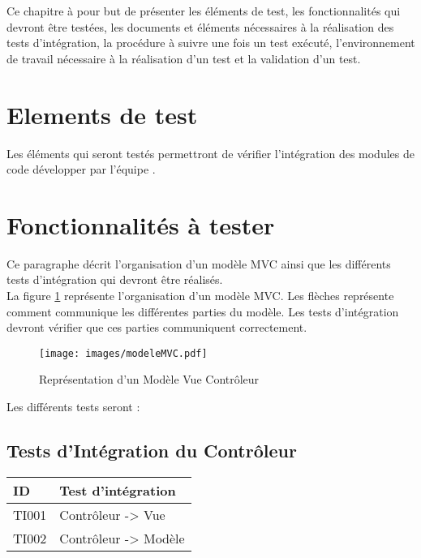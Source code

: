   Ce chapitre à pour but de présenter les éléments de test, les fonctionnalités qui devront être testées, les documents et éléments nécessaires à la réalisation des tests d'intégration, la procédure à suivre une fois un test exécuté, l'environnement de travail nécessaire à la réalisation d'un test et la validation d'un test. 
 
 
 \section{Elements de test}
 	Les éléments qui seront testés permettront de vérifier l'intégration des modules de code développer par l'équipe \nomEquipe.
 	
 \section{Fonctionnalités à tester}
	Ce paragraphe décrit l'organisation d'un modèle MVC ainsi que les différents tests d'intégration qui devront être réalisés. \\ 	
 	
 	La figure \ref{modeleMVC} représente l'organisation d'un modèle MVC. Les flèches représente comment communique les différentes parties du modèle. Les tests d'intégration devront vérifier que ces parties communiquent correctement.
 	
 	\begin{figure}[H]
 		\centering
 		\texttt{[image: images/modeleMVC.pdf]}
 		\caption{Représentation d'un Modèle Vue Contrôleur}
 		\label{modeleMVC}
 	\end{figure}
 	
 Les différents tests seront :\\
 
 \subsection*{Tests d'Intégration du Contrôleur}
  \begin{center}
    \begin{tabular}[h]{|p{}|p{}|}
	\hline
	ID & Test d'intégration \\\hline
        TI001 & Contrôleur -> Vue \\\hline
        TI002 & Contrôleur -> Modèle \\\hline
     \end{tabular}
  \end{center}
  
